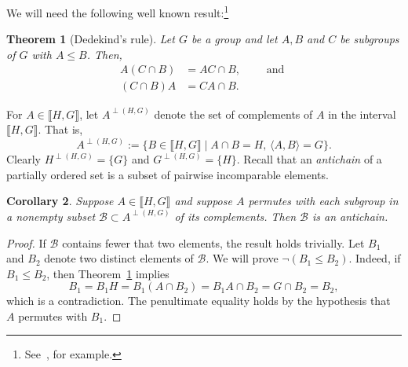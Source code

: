 \documentclass{gen-j-l}
\newcommand{\lb}{\ensuremath{\llbracket}}
\newcommand{\rb}{\ensuremath{\rrbracket}}
\newcommand{\<}{\ensuremath{\langle}}
\newcommand{\cB}{\ensuremath{\mathcal{B}}}
\renewcommand{\>}{\ensuremath{\rangle}}
\theoremstyle{plain}
\newtheorem{theorem}{Theorem}[section]
\newtheorem{corollary}[theorem]{Corollary}
\theoremstyle{definition}
\theoremstyle{remark}
\numberwithin{theorem}{section}
\numberwithin{claim}{section}
\numberwithin{equation}{section}
\numberwithin{conjecture}{section}
\renewcommand{\leq}{\ensuremath{\leqslant}}
\newcommand{\subnormal}{\ensuremath{\trianglelefteqslant}}
\newcommand{\2}{\ensuremath{\mathbf{2}}}
\newcommand{\3}{\ensuremath{\mathbf{3}}}
\begin{document}
We will need the following well known result:\footnote{See~\cite[p.~122]{Rose:1978}, for example.}  
\begin{theorem}[Dedekind's rule]
  \label{lemma-dedekind}
Let $G$ be a group and let $A, B$ and $C$ be subgroups of $G$ with $A\leq B$.  Then,
\begin{align}
\label{eq:dedekind1}
A(C\cap B) &= AC \cap B,\qquad \text{ and }\\
\label{eq:dedekind2}
(C\cap B)A &= CA \cap B.
\end{align}
\end{theorem}

For $A \in \lb H, G \rb$, let $A^{\perp(H,G)}$ denote the set of
complements of $A$ in the interval $\lb H, G\rb$.  That is,
\[
A^{\perp(H,G)} := \{B \in \lb H, G \rb \mid A \cap B = H, \, \<A, B\> = G\}.
\]
Clearly $H^{\perp(H,G)} = \{G\}$ and $G^{\perp(H,G)} = \{H\}$.
Recall that an \emph{antichain} of a partially ordered set is a subset of
pairwise incomparable elements.

\begin{corollary}
\label{cor:dedekind1}
Suppose $A \in \lb H, G\rb$ and suppose $A$ permutes with each subgroup in
a nonempty subset $\cB \subset A^{\perp(H,G)}$ of its complements. Then $\cB$ is an antichain.
\end{corollary}
\begin{proof}
If $\cB$ contains fewer that two elements, the result holds
trivially. Let $B_1$ and $B_2$ denote two distinct elements of $\cB$. 
We will prove $\neg (B_1 \leq B_2)$.  Indeed, if $B_1 \leq B_2$, then 
Theorem~\ref{lemma-dedekind} implies
\[
B_1 = B_1H = B_1(A \cap B_2) = B_1A \cap B_2 = G \cap B_2 = B_2,
\]
which is a contradiction.  The penultimate equality holds by the hypothesis that
$A$ permutes with $B_1$. 
\end{proof}

\end{document}
